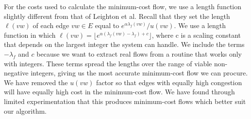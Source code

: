 For the costs used to calculate the minimum-cost flow, we use a length
function slightly different from that of Leighton et al.
Recall that they set the length $\ell (vw)$ of each edge $vw \in E$ equal to 
$e^{\alpha \lambda_f(vw)} / u(vw)$.
We use a length function in which 
$\ell (vw) = \lfloor e^{\alpha (\lambda_f(vw) - \lambda_f) + c}\rfloor$,
where c is a scaling constant that depends on the largest integer the
system can handle.
We include the terms $-\lambda_f$ and $c$ because we want to extract
real flows from a routine that works only with integers.  These terms
spread the lengths over the range of viable non-negative integers,
giving us the most accurate minimum-cost flow we can procure.
We have removed the $u(vw)$ factor so that edges with equally high
congestion will have equally high cost in the minimum-cost flow.
We have found through limited experimentation
that this produces minimum-cost flows which better suit
our algorithm.

